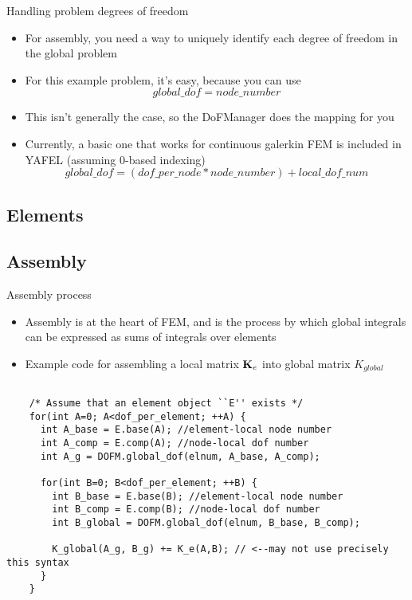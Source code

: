 \begin{frame}{Handling problem degrees of freedom}
  \begin{itemize}
  \item
    For assembly, you need a way to uniquely identify each
    degree of freedom in the global problem
  \item
    For this example problem, it's easy, because you can use
    \[
    global\_dof = node\_number
    \]
  \item
    This isn't generally the case, so the DoFManager does the mapping for you
  \item
    Currently, a basic one that works for continuous galerkin FEM
    is included in YAFEL (assuming 0-based indexing)
    \[
    global\_dof = (dof\_per\_node*node\_number) + local\_dof\_num
    \]
  \end{itemize}
\end{frame}

\subsection{Elements}


\subsection{Assembly}
\begin{frame}[fragile]{Assembly process}
  \begin{itemize}
  \item
    Assembly is at the heart of FEM, and is the process by which
    global integrals can be expressed as sums of integrals over elements
  \item
    Example code for assembling a local matrix $\mathbf{K}_e$ into 
    global matrix $K_{global}$
  \end{itemize}
  \begin{lstlisting}[basicstyle=\tiny\ttfamily]

    /* Assume that an element object ``E'' exists */
    for(int A=0; A<dof_per_element; ++A) {
      int A_base = E.base(A); //element-local node number
      int A_comp = E.comp(A); //node-local dof number
      int A_g = DOFM.global_dof(elnum, A_base, A_comp);

      for(int B=0; B<dof_per_element; ++B) {
        int B_base = E.base(B); //element-local node number
        int B_comp = E.comp(B); //node-local dof number
        int B_global = DOFM.global_dof(elnum, B_base, B_comp);
        
        K_global(A_g, B_g) += K_e(A,B); // <--may not use precisely this syntax
      }
    }
  \end{lstlisting}
\end{frame}

